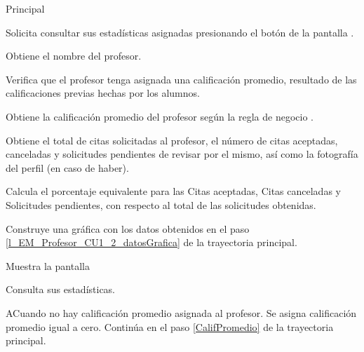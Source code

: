 \begin{UCtrayectoria}{Principal}

	\UCpaso [\UCactor] Solicita consultar sus estadísticas asignadas presionando el botón  de la pantalla .

	\UCpaso Obtiene el nombre del profesor. 

	\UCpaso Verifica que el profesor tenga asignada una calificación promedio, resultado de las calificaciones previas hechas por los alumnos. 

	\UCpaso Obtiene la calificación promedio del profesor según la regla de negocio . \label{CalifPromedio}  

	\UCpaso Obtiene el total de citas solicitadas al profesor, el número de citas aceptadas, canceladas y solicitudes pendientes de revisar por el mismo, así como la fotografía del perfil (en caso de haber). 

	\UCpaso Calcula el porcentaje equivalente para las Citas aceptadas, Citas canceladas y Solicitudes pendientes, con respecto al total de las solicitudes obtenidas. \label{l_EM_Profesor_CU1_2_datosGrafica}

	\UCpaso Construye una gráfica con los datos obtenidos en el paso \ref{l_EM_Profesor_CU1_2_datosGrafica} de la trayectoria principal.

	\UCpaso Muestra la pantalla 

	\UCpaso [\UCactor] Consulta sus estadísticas.

\end{UCtrayectoria}

\begin{UCtrayectoriaA}{A}{Cuando no hay calificación promedio asignada al profesor.}
	\UCpaso	Se asigna calificación promedio igual a cero.
	\UCpaso Continúa en el paso \ref{CalifPromedio} de la trayectoria principal.
\end{UCtrayectoriaA}
